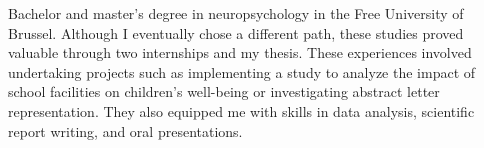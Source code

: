 \documentclass[11pt, oneside, a4paper, titlepage]{article}
\begin{document}
\begin{tcolorbox}[colframe=white, colback=white]
\begin{minipage}[t]{0.60\linewidth}
    \small{
      Bachelor and master's degree in neuropsychology in the Free University 
      of Brussel. Although I eventually chose a different path, these studies 
      proved valuable through two internships and my thesis. These experiences 
      involved undertaking projects such as implementing a study to analyze the 
      impact of school facilities on children's well-being or investigating 
      abstract letter representation. They also equipped me with skills in data 
      analysis, scientific report writing, and oral presentations.
    }

  \end{minipage}

\end{tcolorbox}
\end{document}
